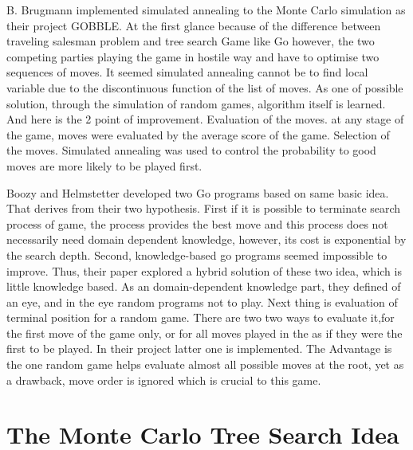 \documentclass[11pt]{article}
\begin{document}
B. Brugmann implemented simulated annealing to the Monte Carlo simulation as their project GOBBLE\cite{brugmann1993monte}. At the first glance because of the difference between traveling salesman problem and tree search Game like Go however, the two competing parties playing the game in hostile way and have to optimise two sequences of moves. It seemed simulated annealing cannot be to find local variable due to the discontinuous function of the list of moves. As one of possible solution, through the simulation of random games, algorithm itself is learned. And here is the 2 point of improvement. Evaluation of the moves. at any stage of the game, moves were evaluated by the average score of the game. Selection of the moves. Simulated annealing was used to control the probability to good moves are more likely to be played first.

Boozy and Helmstetter developed two Go programs based on same basic idea\cite{bouzy2004monte}. That derives from their two hypothesis. First if it is possible to terminate search process of game, the process provides the best move and this process does not necessarily need domain dependent knowledge, however, its cost is exponential by the search depth. Second, knowledge-based go programs seemed impossible to improve. Thus, their paper explored a hybrid solution of these two idea, which is little knowledge based. As an domain-dependent knowledge part, they defined of an {eye}, and in the {eye} random programs not to play. Next thing is evaluation of terminal position for a random game. There are two two ways to evaluate it,{for the first move of the game only}, or  {for all moves played in the as if they were the first to be played.} In their project latter one is implemented. The Advantage is the one random game helps evaluate almost all possible moves at the root, yet as a drawback, move order is ignored which is crucial to this game. 

\section{The Monte Carlo Tree Search Idea}
\end{document}

